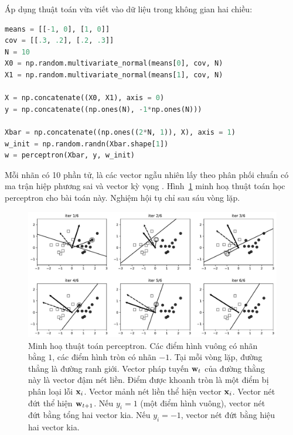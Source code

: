 Áp dụng thuật toán vừa viết vào dữ liệu trong không gian hai chiều:
\begin{lstlisting}[language=Python]
means = [[-1, 0], [1, 0]]
cov = [[.3, .2], [.2, .3]]
N = 10
X0 = np.random.multivariate_normal(means[0], cov, N)
X1 = np.random.multivariate_normal(means[1], cov, N)

X = np.concatenate((X0, X1), axis = 0)
y = np.concatenate((np.ones(N), -1*np.ones(N)))

Xbar = np.concatenate((np.ones((2*N, 1)), X), axis = 1)
w_init = np.random.randn(Xbar.shape[1])
w = perceptron(Xbar, y, w_init)
\end{lstlisting}
Mỗi nhãn có 10 phần tử, là các vector ngẫu nhiên lấy theo phân phối chuẩn có ma trận hiệp phương sai  và vector kỳ vọng . Hình~\ref{fig:9_vis} minh hoạ thuật toán học perceptron cho bài toán này. Nghiệm hội tụ chỉ sau sáu vòng lặp.
\begin{figure}[t]
\centering
\includegraphics[width = \textwidth]{ebookML_src/src/perceptron/pla_visualize1.pdf}
\caption[]{Minh hoạ thuật toán perceptron. Các điểm hình vuông có nhãn bằng $1$, các điểm hình tròn có nhãn $-1$. Tại mỗi vòng lặp, đường thẳng là đường ranh giới. Vector pháp tuyến $\mathbf{w}_t$ của đường thằng này là vector đậm nét liền. Điểm được khoanh tròn là một điểm bị phân loại lỗi $\mathbf{x}_i$. Vector mảnh nét liền thể hiện vector $\mathbf{x}_i$. Vector nét đứt thể hiện $\mathbf{w}_{t+1}$. Nếu $y_i = 1$ (một điểm hình vuông), vector nét đứt bằng tổng hai vector kia. Nếu $y_i = -1$, vector nét đứt bằng hiệu hai vector kia.}
\label{fig:9_vis}
\end{figure}
